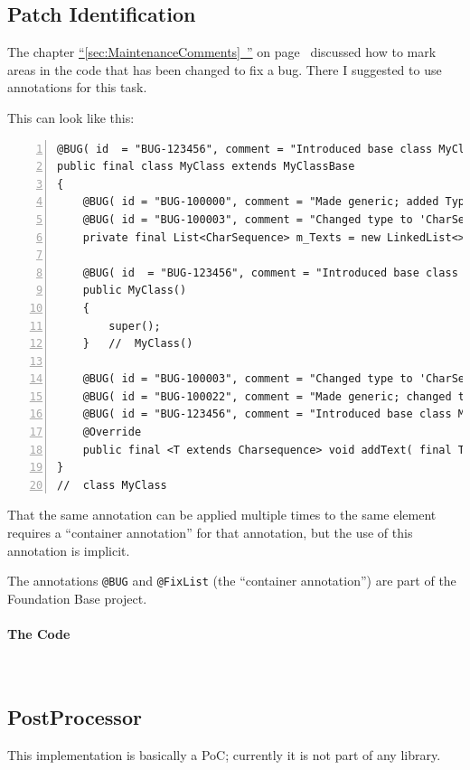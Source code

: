 \documentclass[11pt,a4paper, titlepage, parskip=half, headsepline, footsepline, cleardoublepage=current, headheight=1cm]{scrbook}
\newcommand*{\tqfullvref}[1]{\hyperref[{#1}]{“\ref*{#1}~\nameref*{#1}”} on page~\pageref{#1}}
\begin{document}
\subsection{Patch Identification}\label{sec:PatchIdentification}
The chapter \tqfullvref{sec:MaintenanceComments} discussed how to mark areas in the code that has been changed to fix a bug. There I suggested to use annotations for this task.

This can look like this:
\begin{lstlisting}[numbers=left]
@BUG( id  = "BUG-123456", comment = "Introduced base class MyClassBase" )
public final class MyClass extends MyClassBase
{
    @BUG( id = "BUG-100000", comment = "Made generic; added Typ 'String'" )
    @BUG( id = "BUG-100003", comment = "Changed type to 'CharSequence'" )
    private final List<CharSequence> m_Texts = new LinkedList<>();

    @BUG( id  = "BUG-123456", comment = "Introduced base class MyClassBase; calling super()" )
    public MyClass()
    {
        super();
    }   //  MyClass()
    
    @BUG( id = "BUG-100003", comment = "Changed type to 'CharSequence'" )
    @BUG( id = "BUG-100022", comment = "Made generic; changed to 'extends CharSequence'" )
    @BUG( id = "BUG-123456", comment = "Introduced base class MyClassBase; added @Override" )
    @Override
    public final <T extends Charsequence> void addText( final T text ) { … }
}
//  class MyClass
\end{lstlisting}

That the same annotation can be applied multiple times to the same element requires a “container annotation” for that annotation\autocite{ORACLE_DOC_LANGUAGE_SPECIFICATION:RepeatableAnnotationInterfaces}, but the use of this annotation is implicit.

The annotations \lstinline|@BUG| and \lstinline|@FixList| (the “container annotation”) are part of the Foundation Base project\autocite{TQUADRAT_ORG_FOUNDATION_BASE, TQUADRAT_ORG_FOUNDATION_BUG, TQUADRAT_ORG_FOUNDATION_FIXLIST}.

\paragraph{The Code} \




\subsection{PostProcessor}\label{sec:PostProcessor}
This implementation is basically a PoC; currently it is not part of any library.
\end{document}
